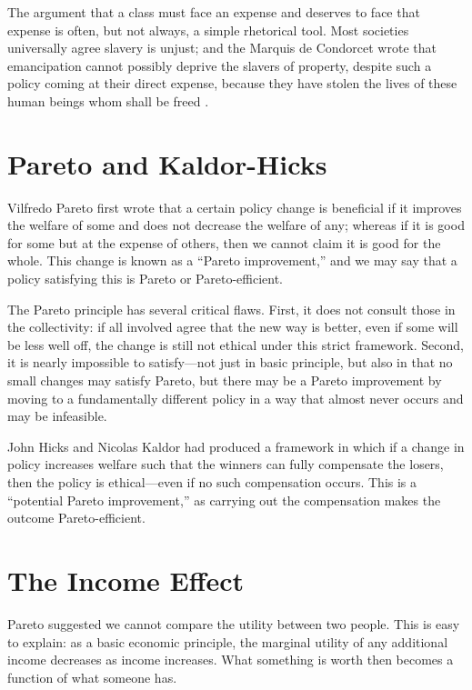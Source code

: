 The argument that a class must face an expense and deserves to face that expense is often, but not always, a simple rhetorical tool.  Most societies universally agree slavery is unjust; and the Marquis de Condorcet wrote that emancipation cannot possibly deprive the slavers of property, despite such a policy coming at their direct expense, because they have stolen the lives of these human beings whom shall be freed \autocite{Condorcet1781}.

\section{Pareto and Kaldor-Hicks}

Vilfredo Pareto first wrote that a certain policy change is beneficial if it improves the welfare of some and does not decrease the welfare of any; whereas if it is good for some but at the expense of others, then we cannot claim it is good for the whole.  This change is known as a ``Pareto improvement,'' and we may say that a policy satisfying this is Pareto or Pareto-efficient.

The Pareto principle has several critical flaws.  First, it does not consult those in the collectivity:  if all involved agree that the new way is better, even if some will be less well off, the change is still not ethical under this strict framework.  Second, it is nearly impossible to satisfy—not just in basic principle, but also in that no small changes may satisfy Pareto, but there may be a Pareto improvement by moving to a fundamentally different policy in a way that almost never occurs and may be infeasible.

John Hicks and Nicolas Kaldor had produced a framework in which if a change in policy increases welfare such that the winners can fully compensate the losers, then the policy is ethical—even if no such compensation occurs.  This is a ``potential Pareto improvement,'' as carrying out the compensation makes the outcome Pareto-efficient.

\section{The Income Effect}

Pareto suggested we cannot compare the utility between two people.  This is easy to explain:  as a basic economic principle, the marginal utility of any additional income decreases as income increases.  What something is worth then becomes a function of what someone has.

